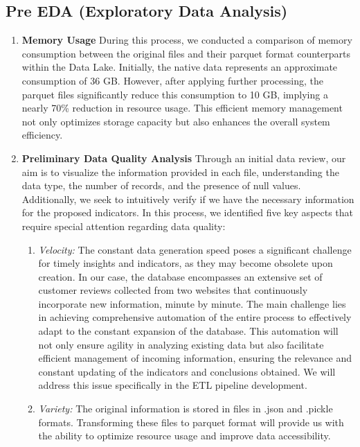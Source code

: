 \documentclass[12pt]{article}
\begin{document}
\subsection{Pre EDA (Exploratory Data Analysis)}
\begin{enumerate}
    \item \textbf{Memory Usage}
    During this process, we conducted a comparison of memory consumption between the original files and their parquet format counterparts within the Data Lake. Initially, the native data represents an approximate consumption of 36 GB. However, after applying further processing, the parquet files significantly reduce this consumption to 10 GB, implying a nearly 70\% reduction in resource usage. This efficient memory management not only optimizes storage capacity but also enhances the overall system efficiency.

    \item \textbf{Preliminary Data Quality Analysis}
    Through an initial data review, our aim is to visualize the information provided in each file, understanding the data type, the number of records, and the presence of null values. Additionally, we seek to intuitively verify if we have the necessary information for the proposed indicators. In this process, we identified five key aspects that require special attention regarding data quality:
    
    \begin{enumerate}
        \item \textit{Velocity:} The constant data generation speed poses a significant challenge for timely insights and indicators, as they may become obsolete upon creation. In our case, the database encompasses an extensive set of customer reviews collected from two websites that continuously incorporate new information, minute by minute. The main challenge lies in achieving comprehensive automation of the entire process to effectively adapt to the constant expansion of the database. This automation will not only ensure agility in analyzing existing data but also facilitate efficient management of incoming information, ensuring the relevance and constant updating of the indicators and conclusions obtained. We will address this issue specifically in the ETL pipeline development.
        
        \item \textit{Variety:} The original information is stored in files in .json and .pickle formats. Transforming these files to parquet format will provide us with the ability to optimize resource usage and improve data accessibility.
        

\end{enumerate}
\end{enumerate}
\end{document}
